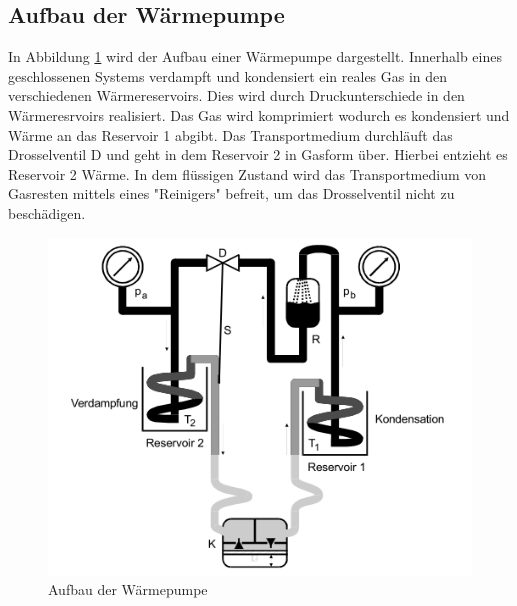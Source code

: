 \subsection{Aufbau der Wärmepumpe}
\label{sec:AdW}
In Abbildung \ref{fig:aufbau} wird der Aufbau einer Wärmepumpe dargestellt.
Innerhalb eines geschlossenen Systems verdampft und kondensiert ein reales Gas in den verschiedenen Wärmereservoirs.
Dies wird durch Druckunterschiede in den Wärmeresrvoirs realisiert.
Das Gas wird komprimiert wodurch es kondensiert und Wärme an das Reservoir 1 abgibt.
Das Transportmedium durchläuft das Drosselventil D und geht in dem Reservoir 2 in Gasform über.
Hierbei entzieht es Reservoir 2 Wärme.
In dem flüssigen Zustand wird das Transportmedium von Gasresten mittels eines "Reinigers" befreit, um das Drosselventil nicht zu beschädigen.
\begin{figure}[H]
    \centering
    \includegraphics[width=\textwidth]{content/aufbau.png}
    \caption{Aufbau der Wärmepumpe\cite{v206}}
    \label{fig:aufbau}
\end{figure}
